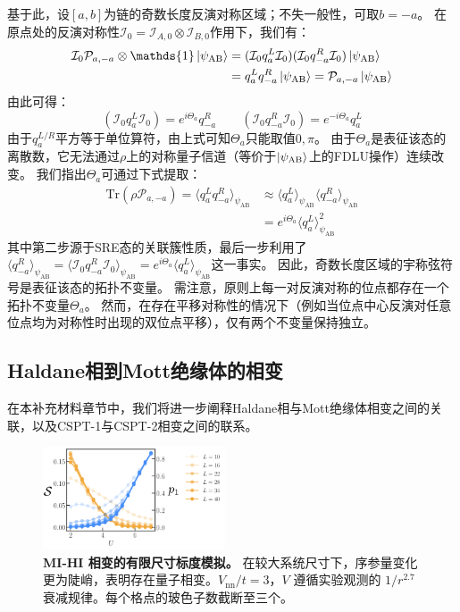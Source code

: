 \documentclass[preprint,superscriptaddress,floatfix, nofootinbib]{revtex4-2}
\begin{document}
基于此，设$[a, b]$为链的奇数长度反演对称区域；不失一般性，可取$b = -a$。
在原点处的反演对称性$\mathcal{I}_0 = \mathcal{I}_{A, 0} \otimes \mathcal{I}_{B, 0}$作用下，我们有：
\begin{align}
    \mathcal{I}_{0} \mathcal{P}_{a, -a} \otimes \mathds{1} \ket{\psi_{\text{AB}}} &= (\mathcal{I}_0 q_{a}^L \mathcal{I}_0)(\mathcal{I}_0 q_{-a}^R \mathcal{I}_0) \ket{\psi_{\text{AB}}} \nonumber\\
    &= q_{a}^L q_{-a}^{R}\ket{\psi_{\text{AB}}} = \mathcal{P}_{a,-a} \ket{\psi_{\text{AB}}}
\end{align}
由此可得：
\begin{equation}
     (\mathcal{I}_0 q_{a}^L \mathcal{I}_0) = e^{i \Theta_a} q_{-a}^{R} \qquad (\mathcal{I}_0 q_{-a}^R \mathcal{I}_0) = e^{-i \Theta_a} q_{a}^{L}
\end{equation}
由于$q_a^{L/R}$平方等于单位算符，由上式可知$\Theta_a$只能取值$0, \pi$。
由于$\Theta_a$是表征该态的离散数，它无法通过$\rho$上的对称量子信道（等价于$\ket{\psi_{\text{AB}}}$上的FDLU操作）连续改变。
我们指出$\Theta_a$可通过下式提取：
\begin{align}
    \text{Tr}\left(\rho \mathcal{P}_{a, -a} \right) = \langle q_a^L q_{-a}^R \rangle_{\psi_{\text{AB}}} &\approx \langle q^L_a \rangle_{\psi_{\text{AB}}} \langle q^R_{-a} \rangle_{\psi_{\text{AB}}}\\
    &= e^{i \Theta_a} \langle q_a^L \rangle^2_{\psi_{\text{AB}}}
\end{align}
其中第二步源于SRE态的关联簇性质，最后一步利用了$\langle q_{-a}^R \rangle_{\psi_{\text{AB}}} = \langle \mathcal{I}_0 q_{-a}^R \mathcal{I}_0 \rangle_{\psi_{\text{AB}}} = e^{i \Theta_a} \langle q_a^{L} \rangle_{\psi_{\text{AB}}}$这一事实。
因此，奇数长度区域的宇称弦符号是表征该态的拓扑不变量。
需注意，原则上每一对反演对称的位点都存在一个拓扑不变量$\Theta_a$。
然而，在存在平移对称性的情况下（例如当位点中心反演对任意位点均为对称性时出现的双位点平移），仅有两个不变量保持独立\cite{Sahay2025}。
\subsection*{Haldane相到Mott绝缘体的相变}

在本补充材料章节中，我们将进一步阐释Haldane相与Mott绝缘体相变之间的关联，以及CSPT-1与CSPT-2相变之间的联系。

\begin{figure}
    \centering
    \includegraphics[width=0.48\textwidth]{figures/Finite_size_scaling.pdf}
    \caption{\textbf{MI-HI 相变的有限尺寸标度模拟。} 在较大系统尺寸下，序参量变化更为陡峭，表明存在量子相变。$V_\mathrm{nn}/t=3$，$V$ 遵循实验观测的 $1/r^{2.7}$ 衰减规律。每个格点的玻色子数截断至三个。}
    \label{fig: finite_size_scaling}
\end{figure}
\end{document}
